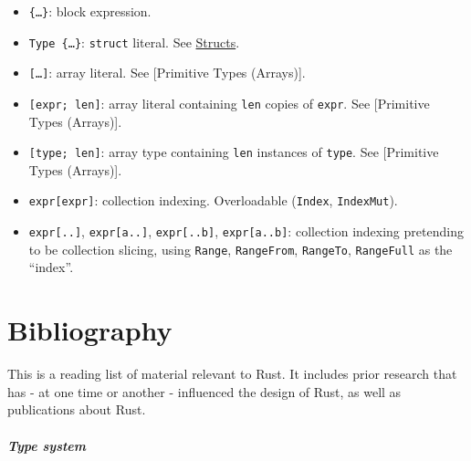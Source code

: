 \documentclass[a4paper,]{book}
\providecommand{\tightlist}{%
  \setlength{\itemsep}{0pt}\setlength{\parskip}{0pt}}
\let\oldparagraph\paragraph
\renewcommand{\paragraph}[1]{\oldparagraph{#1}\mbox{}}
\begin{document}
\begin{itemize}
\tightlist
\item
  \texttt{\{\ldots{}\}}: block expression.
\item
  \texttt{Type\ \{\ldots{}\}}: \texttt{struct} literal. See
  \protect\hyperlink{sec--structs}{Structs}.
\end{itemize}

\begin{itemize}
\tightlist
\item
  \texttt{{[}\ldots{}{]}}: array literal. See {[}Primitive Types
  (Arrays){]}.
\item
  \texttt{{[}expr;\ len{]}}: array literal containing \texttt{len}
  copies of \texttt{expr}. See {[}Primitive Types (Arrays){]}.
\item
  \texttt{{[}type;\ len{]}}: array type containing \texttt{len}
  instances of \texttt{type}. See {[}Primitive Types (Arrays){]}.
\item
  \texttt{expr{[}expr{]}}: collection indexing. Overloadable
  (\texttt{Index}, \texttt{IndexMut}).
\item
  \texttt{expr{[}..{]}}, \texttt{expr{[}a..{]}}, \texttt{expr{[}..b{]}},
  \texttt{expr{[}a..b{]}}: collection indexing pretending to be
  collection slicing, using \texttt{Range}, \texttt{RangeFrom},
  \texttt{RangeTo}, \texttt{RangeFull} as the ``index''.
\end{itemize}

\hypertarget{sec--bibliography}{\chapter{Bibliography}\label{sec--bibliography}}

This is a reading list of material relevant to Rust. It includes prior
research that has - at one time or another - influenced the design of
Rust, as well as publications about Rust.

\paragraph{Type system}\label{type-system}
\end{document}
